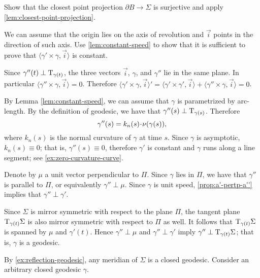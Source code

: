 Show that the closest point projection $\partial B \to \Sigma $ is surjective and apply \ref{lem:closest-point-projection}.

\setcounter{eqtn}{0}


We can assume that the origin lies on the axis of revolution and $\vec i$ points in the direction of such axis.
Use \ref{lem:constant-speed} to show that it is sufficient to prove that 
$\langle\gamma'\times \gamma,\vec i\rangle$
is constant.

Since $\gamma''(t)\perp\mathrm{T}_{\gamma(t)}$, the three vectors $\vec i$, $\gamma$, and $\gamma''$ lie in the same plane.
In particular $\langle\gamma''\times \gamma,\vec i\rangle=0$.
Therefore
$
\langle\gamma'\times \gamma,\vec i\rangle'
=
\langle\gamma'\times \gamma',\vec i\rangle+\langle\gamma''\times \gamma,\vec i\rangle =0
$.



 By Lemma \ref{lem:constant-speed},
we can assume that $\gamma$ is parametrized by arc-length.
By the definition of geodesic, we have that $\gamma''(s)\perp\mathrm{T}_{\gamma(s)}$. 
Therefore 
\[\gamma''(s)=k_n(s)\cdot\Norm(\gamma(s)),\]
where $k_n(s)$ is the normal curvature of $\gamma$ at time $s$.
Since $\gamma$ is asymptotic, $k_n(s)\equiv 0$;
that is, $\gamma''(s)\equiv 0$, therefore $\gamma'$ is constant and $\gamma$ runs along a line segment; see \ref{ex:zero-curvature-curve}.




Denote by $\mu$ a unit vector perpendicular to $\Pi$.
Since $\gamma$ lies in $\Pi$, we have that $\gamma''$ is parallel to $\Pi$, or equivalently $\gamma''\perp \mu$.
Since $\gamma$ is unit speed, \ref{prop:a'-pertp-a''} implies that $\gamma''\perp\gamma'$.

Since $\Sigma$ is mirror symmetric with respect to the plane $\Pi$,
the tangent plane $\mathrm{T}_{\gamma(t)}\Sigma$ is also mirror symmetric with respect to  $\Pi$ as well.
It follows that $\mathrm{T}_{\gamma(t)}\Sigma$ is spanned by $\mu$ and $\gamma'(t)$.
Hence $\gamma''\perp \mu$ and $\gamma''\perp\gamma'$ imply $\gamma''\perp\mathrm{T}_{\gamma(t)}\Sigma$;
that is, $\gamma$ is a geodesic.



By \ref{ex:reflection-geodesic}, any meridian of $\Sigma$ is a closed geodesic.
Consider an arbitrary closed geodesic $\gamma$.

